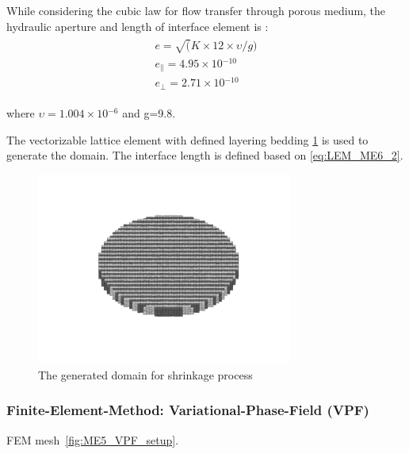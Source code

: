 While considering the cubic law for flow transfer through porous medium, the hydraulic aperture and length of interface element is :
\begin{align}
\label{eq:LEM_ME6_2}
\begin{split}
e=\sqrt(K\times12\times\upsilon/g)\\
e_\parallel=4.95\times{10}{^{-10}}\\ e_\bot=2.71\times{10}{^{-10}}
\end{split}
\end{align}

where $\upsilon=1.004\times{10}{^{-6}}$ and g=9.8. 

The vectorizable lattice element with defined layering bedding \ref{fig:Amir_ME6_Lattice_Setup} is used to generate the domain. The interface length is defined based on \ref{eq:LEM_ME6_2}.

\begin{figure}[!ht]
\centering
\includegraphics[width=0.75\textwidth]{figures/Amir_ME6_Lattice_Setup.png}
\caption{The generated domain for shrinkage process}
\label{fig:Amir_ME6_Lattice_Setup}
\end{figure} 

\subsubsection*{Finite-Element-Method: Variational-Phase-Field (VPF)}
FEM mesh~\ref{fig:ME5_VPF_setup}.

